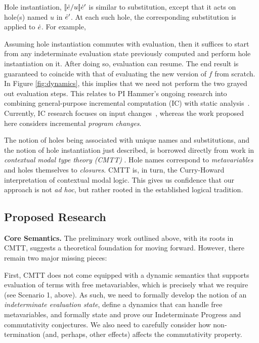 Hole instantiation, $[\!| \dot{e} / u |\!]\dot{e}'$ is similar to substitution, except that it acts on
 hole(s) named $u$ in $\dot{e}'$. At each such hole, the corresponding substitution is applied to $\dot{e}$. For example,

Assuming hole instantiation commutes with evaluation, then it suffices to start from any indeterminate evaluation 
state previously computed and perform hole instantiation on it. After doing so, evaluation can resume. The end result is guaranteed to coincide with that of evaluating the new version of $f$ from scratch. In Figure \ref{fig:dynamics}, this implies that we need not perform the two grayed out evaluation steps. This relates to PI Hammer's
ongoing research into combining general-purpose incremental
computation (IC) with static analysis~\cite{OVV2016}. 
%
Currently, IC research focuses on input
changes~\citep{TypedAdapton2016, Fisher2016, Hammer2015, Chen2014,
Hammer2014, Chen2011, Hammer2011, Hammer2009, Hammer2008}, whereas the
work proposed here considers incremental \emph{program changes}.

The notion of holes being associated with unique names and substitutions, and the notion of hole instantiation just described, is borrowed directly from work in \emph{contextual modal type theory (CMTT)} \cite{Nanevski2008}. Hole names correspond to \emph{metavariables} and holes themselves to \emph{closures}. CMTT is, in turn, the Curry-Howard interpretation of contextual modal logic. This gives us confidence that our approach is not \emph{ad hoc}, but rather rooted in the established logical tradition.

\subsection{Proposed Research}

\noindent\textbf{Core Semantics.} The preliminary work outlined above, with its roots in CMTT, suggests a theoretical foundation for moving forward. However, there remain two major missing pieces:

First, CMTT does not come equipped with a dynamic semantics that supports evaluation of terms with free metavariables, which is precisely what we require (see Scenario 1, above). As such, we need to formally develop the notion of an \emph{indeterminate evaluation state}, define a dynamics that can handle free metavariables, and formally state and prove our Indeterminate Progress and commutativity conjectures. We also need to carefully consider how non-termination (and, perhaps, other effects) affects the commutativity property.

